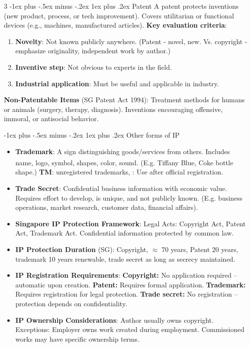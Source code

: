 \documentclass[10pt, landscape]{article}
\makeatletter
\renewcommand{\subsubsection}{\@startsection{subsubsection}{3}{0mm}%
                                {-1ex plus -.5ex minus -.2ex}%
                                {1ex plus .2ex}%
                                {\normalfont\small\bfseries}}
\makeatother
\begin{document}
\begin{multicols*}{3}
\subsubsection{Patent}
A patent protects inventions (new product, process, or tech improvement). Covers utilitarian or functional devices (e.g., machines, manufactured articles).
\textbf{Key evaluation criteria}:
\begin{enumerate}[itemsep=-1pt]
	\item \textbf{Novelty}: Not known publicly anywhere. (Patent - novel, new. Vs. copyright - emphasize originality, independent work by author.)
      \item \textbf{Inventive step}: Not obvious to experts in the field.
      \item \textbf{Industrial application}: Must be useful and applicable in industry.
\end{enumerate}
\textbf{Non-Patentable Items} (SG Patent Act 1994): Treatment methods for humans or animals (surgery, therapy, diagnosis). Inventions encouraging offensive, immoral, or antisocial behavior.

\subsubsection{Other forms of IP}
\begin{itemize}
\item \textbf{Trademark}: A sign distinguishing goods/services from others. Includes name, logo, symbol, shapes, color, sound. (E.g. Tiffany Blue\textsuperscript{\textregistered}, Coke bottle shape.) \textbf{TM}: unregistered trademarks, \textbf{\textregistered}: Use after official registration.
\item \textbf{Trade Secret}: Confidential business information with economic value. Requires effort to develop, is unique, and not publicly known. (E.g. business operations, market research, customer data, financial affairs).
\item \textbf{Singapore IP Protection Framework}: Legal Acts: Copyright Act, Patent Act, Trademark Act. Confidential information protected by common law.
\item \textbf{IP Protection Duration} (SG): Copyright, $\approx$ 70 years, Patent 20 years, trademark 10 years renewable, trade secret as long as secrecy maintained.
\item \textbf{IP Registration Requirements}: \textbf{Copyright:} No application required – automatic upon creation. \textbf{Patent:} Requires formal application.
\textbf{Trademark:} Requires registration for legal protection. \textbf{Trade secret:} No registration – protection depends on confidentiality.
\item \textbf{IP Ownership Considerations}: Author usually owns copyright. Exceptions: Employer owns work created during employment. Commissioned works may have specific ownership terms.
\end{itemize}





\end{multicols*}
\end{document}
